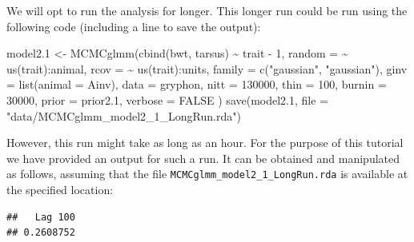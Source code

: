 \documentclass[
  12pt,
]{book}
\newenvironment{Shaded}{\begin{snugshade}}{\end{snugshade}}
\newcommand{\AttributeTok}[1]{\textcolor[rgb]{0.77,0.63,0.00}{#1}}
\newcommand{\ConstantTok}[1]{\textcolor[rgb]{0.00,0.00,0.00}{#1}}
\newcommand{\DecValTok}[1]{\textcolor[rgb]{0.00,0.00,0.81}{#1}}
\newcommand{\FloatTok}[1]{\textcolor[rgb]{0.00,0.00,0.81}{#1}}
\newcommand{\FunctionTok}[1]{\textcolor[rgb]{0.00,0.00,0.00}{#1}}
\newcommand{\NormalTok}[1]{#1}
\newcommand{\OtherTok}[1]{\textcolor[rgb]{0.56,0.35,0.01}{#1}}
\newcommand{\SpecialCharTok}[1]{\textcolor[rgb]{0.00,0.00,0.00}{#1}}
\newcommand{\StringTok}[1]{\textcolor[rgb]{0.31,0.60,0.02}{#1}}
\begin{document}
We will opt to run the analysis for longer. This longer run could be run using the following code (including a line to save the output):

\begin{Shaded}
\begin{Highlighting}[]
\NormalTok{model2}\FloatTok{.1} \OtherTok{\textless{}{-}} \FunctionTok{MCMCglmm}\NormalTok{(}\FunctionTok{cbind}\NormalTok{(bwt, tarsus) }\SpecialCharTok{\textasciitilde{}}\NormalTok{ trait }\SpecialCharTok{{-}} \DecValTok{1}\NormalTok{,}
  \AttributeTok{random =} \SpecialCharTok{\textasciitilde{}} \FunctionTok{us}\NormalTok{(trait)}\SpecialCharTok{:}\NormalTok{animal,}
  \AttributeTok{rcov =} \SpecialCharTok{\textasciitilde{}} \FunctionTok{us}\NormalTok{(trait)}\SpecialCharTok{:}\NormalTok{units,}
  \AttributeTok{family =} \FunctionTok{c}\NormalTok{(}\StringTok{"gaussian"}\NormalTok{, }\StringTok{"gaussian"}\NormalTok{),}
  \AttributeTok{ginv =} \FunctionTok{list}\NormalTok{(}\AttributeTok{animal =}\NormalTok{ Ainv),}
  \AttributeTok{data =}\NormalTok{ gryphon,}
  \AttributeTok{nitt =} \DecValTok{130000}\NormalTok{, }\AttributeTok{thin =} \DecValTok{100}\NormalTok{, }\AttributeTok{burnin =} \DecValTok{30000}\NormalTok{,}
  \AttributeTok{prior =}\NormalTok{ prior2}\FloatTok{.1}\NormalTok{, }\AttributeTok{verbose =} \ConstantTok{FALSE}
\NormalTok{)}
\FunctionTok{save}\NormalTok{(model2}\FloatTok{.1}\NormalTok{, }\AttributeTok{file =} \StringTok{"data/MCMCglmm\_model2\_1\_LongRun.rda"}\NormalTok{)}
\end{Highlighting}
\end{Shaded}

However, this run might take as long as an hour. For the purpose of this tutorial we have provided an output for such a run. It can be obtained and manipulated as follows, assuming that the file \texttt{MCMCglmm\_model2\_1\_LongRun.rda} is available at the specified location:

\begin{Shaded}
\end{Shaded}

\begin{verbatim}
##   Lag 100 
## 0.2608752
\end{verbatim}
\end{document}
